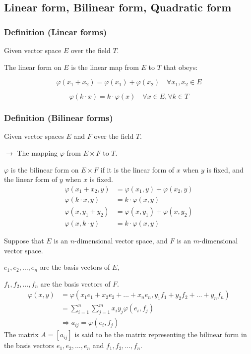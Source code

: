 \subsection{Linear form, Bilinear form, Quadratic form}
\subsubsection{Definition (Linear forms)}

Given vector space $E$ over the field $T$.

The linear form on $E$ is the linear map from $E$ to $T$ that obeys:

\[
\varphi(x_1 + x_2) = \varphi(x_1) + \varphi(x_2) \quad \forall x_1, x_2 \in E
\]

\[
\varphi(k \cdot x) = k \cdot \varphi(x) \quad \forall x \in E, \forall k \in T
\]

\subsubsection{Definition (Bilinear forms)}

Given vector spaces $E$ and $F$ over the field $T$.

$\rightarrow$ The mapping $\varphi$ from $E \times F$ to $T$.

$\varphi$ is the bilinear form on $E \times F$ if it is the linear form of $x$ when $y$ is fixed, and the linear form of $y$ when $x$ is fixed.
\begin{align*}
    \varphi(x_1 + x_2, y) &= \varphi(x_1, y) + \varphi(x_2, y)\\
    \varphi(k \cdot x, y) &= k \cdot \varphi(x, y)\\
    \varphi(x, y_1 + y_2) &= \varphi(x, y_1) + \varphi(x, y_2)\\
    \varphi(x, k \cdot y) &= k \cdot \varphi(x, y)
\end{align*}


Suppose that $E$ is an $n$-dimensional vector space, and $F$ is an $m$-dimensional vector space.

$e_1, e_2, \ldots, e_n$ are the basis vectors of $E$,

$f_1, f_2, \ldots, f_n$ are the basis vectors of $F$.
\begin{align*}
    \varphi(x, y) &= \varphi(x_1 e_1 + x_2 e_2 + \ldots + x_n e_n, y_1 f_1 + y_2 f_2 + \ldots + y_n f_n)\\
    &= \sum^n_{i=1}\sum^m_{j=1}x_iy_j\varphi(e_i, f_j)\\
    &\Rightarrow a_{ij} = \varphi(e_i, f_j)
\end{align*}
The matrix $A = [a_{ij}]$ is said to be the matrix representing the bilinear form in the basis vectors $e_1, e_2, \ldots, e_n$ and $f_1, f_2, \ldots, f_n$.

